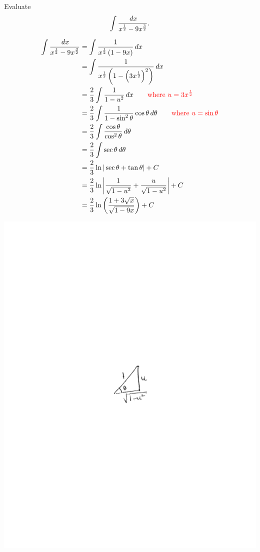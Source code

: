\documentclass[]{ximera}
\begin{document}
\begin{problem}
Evaluate
	\[
	\int \frac{\,d x}{x^{\frac{1}{2}} - 9x^{\frac{3}{2}}}.
	\]
	\begin{freeResponse}
		\begin{align*}
		\int \frac{\,d x}{x^{\frac{1}{2}} - 9x^{\frac{3}{2}}}
		&= \int \frac{1}{x^{\frac{1}{2}} \left( 1 - 9x \right)} \,d x  \\
		&= \int \frac{1}{x^{\frac{1}{2}} \left( 1 - \left( 3x^{\frac{1}{2}} \right)^2 \right)} \,d x  \\
		&= \frac{2}{3} \int \frac{1}{1-u^2} \,d x 	\qquad	{\color{red}\text{where }u=3x^{\frac{1}{2}}}  \\
		&= \frac{2}{3} \int \frac{1}{1-\sin^2 \theta} \cos \theta \,d \theta	\qquad	{\color{red} \text{where } u=\sin \theta}  \\
		&= \frac{2}{3} \int \frac{\cos \theta}{\cos^2 \theta} \,d \theta  \\
		&= \frac{2}{3} \int \sec \theta \,d \theta  \\
		&= \frac{2}{3} \ln | \sec \theta + \tan \theta | + C  \\
		&= \frac{2}{3} \ln \left| \frac{1}{\sqrt{1-u^2}} + \frac{u}{\sqrt{1-u^2}} \right| + C  \\
		&= \frac{2}{3} \ln \left( \frac{1 + 3\sqrt{x}}{\sqrt{1-9x}} \right) + C
		\end{align*}
		
		\begin{image}
		\includegraphics[trim= 270 350 250 360]{Figure7-4-4.pdf}
		\end{image}
		

\end{freeResponse}
\end{problem}
\end{document}
